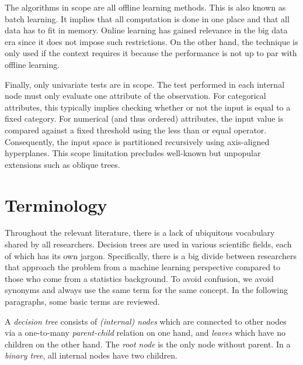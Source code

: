 The algorithms in scope are all offline learning methods. This is also known as batch learning. It implies that all computation is done in one place and that all data has to fit in memory. Online learning has gained relevance in the big data era since it does not impose such restrictions. On the other hand, the technique is only used if the context requires it because the performance is not up to par with offline learning.

Finally, only univariate tests are in scope. The test performed in each internal node must only evaluate one attribute of the observation. For categorical attributes, this typically implies checking whether or not the input is equal to a fixed category. For numerical (and thus ordered) attributes, the input value is compared against a fixed threshold using the less than or equal operator. Consequently, the input space is partitioned recursively using axis-aligned hyperplanes. This scope limitation precludes well-known but unpopular extensions such as oblique trees.

\section{Terminology}
Throughout the relevant literature, there is a lack of ubiquitous vocabulary shared by all researchers. Decision trees are used in various scientific fields, each of which has its own jargon. Specifically, there is a big divide between researchers that approach the problem from a machine learning perspective compared to those who come from a statistics background. To avoid confusion, we avoid synonyms and always use the same term for the same concept. In the following paragraphs, some basic terms are reviewed. 

A \emph{decision tree} consists of \emph{(internal) nodes} which are connected to other nodes via a one-to-many \emph{parent-child} relation on one hand, and \emph{leaves} which have no children on the other hand. The \emph{root node} is the only node without parent. In a \emph{binary tree}, all internal nodes have two children.

